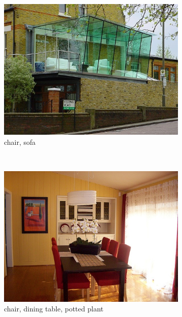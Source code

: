 \begin{figure}[bt]
\begin{subfigure}[b]{0.18\textwidth}
        \includegraphics[width=\textwidth]{000003}
        \caption{\scriptsize chair, sofa}
        \label{fig:voc3}
    \end{subfigure}
    ~
    \begin{subfigure}[b]{0.18\textwidth}
        \centering
        \includegraphics[width=\textwidth]{000006}
        \caption{\scriptsize chair, dining table, potted plant}
        \label{fig:voc4}
    \end{subfigure}
    ~
    \begin{subfigure}[b]{0.18\textwidth}
        \centering

\end{subfigure}
\end{figure}
